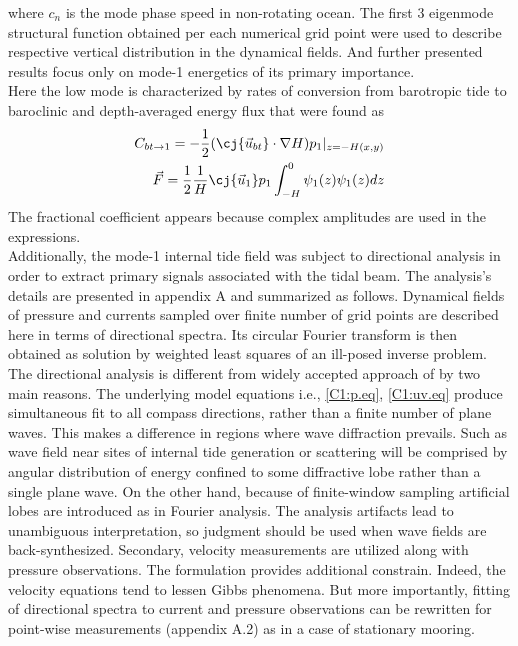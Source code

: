 \documentclass[12pt]{article}
\begin{document}
where $c_n$ is the mode phase speed in non-rotating ocean. The first 3 eigenmode structural 
function obtained per each numerical grid point were used to describe respective vertical 
distribution in the dynamical fields. And further presented results focus only on mode-1 energetics 
of its primary importance.\\
Here the low mode is characterized by rates of conversion from barotropic tide to baroclinic 
\citep{simmons2004internal, kurapov2003m} and depth-averaged energy flux that were found as
\begin{align}
\label{C3:eq.conv}
C_{bt\to 1} = -\frac{1}{2}(\cj{\vec{u}_{bt}} \cdot \nabla H) p_{1}|_{z = -H(x,y)}\\
\vec{F} = \frac{1}{2} \frac{1}{H} \cj{\vec{u}_1} p_1 \int_{-H}^{0} \psi_1(z) \psi_1(z) dz
\end{align}
The fractional coefficient appears because complex amplitudes are used in the expressions.\\
Additionally, the mode-1 internal tide field was subject to directional analysis in order to 
extract primary signals associated with the tidal beam. The analysis's details are presented in 
appendix A and summarized as follows. Dynamical fields of pressure and currents sampled over 
finite number of grid points are described here in terms of directional spectra. Its circular 
Fourier transform is then obtained as solution by weighted least squares of an ill-posed inverse 
problem. The directional analysis is 
different from widely accepted approach of \cite{zhao2010long} by two main reasons. The underlying 
model equations i.e., \eqref{C1:p.eq}, \eqref{C1:uv.eq} produce simultaneous fit to all compass 
directions, rather than a finite number of plane waves. This makes a difference in regions 
where wave diffraction prevails. Such as wave field near sites of internal tide generation or 
scattering will be comprised by angular distribution of energy confined to some diffractive lobe 
rather than a single plane wave. On the other hand, because of finite-window sampling artificial 
lobes are introduced as in Fourier analysis. The analysis artifacts lead to unambiguous 
interpretation, so judgment should be used when wave fields are back-synthesized. Secondary, 
velocity measurements are utilized along with pressure observations. The formulation provides 
additional constrain. Indeed, the velocity equations tend to lessen Gibbs phenomena. But 
more importantly, fitting of directional spectra to current and pressure observations can 
be rewritten for point-wise measurements (appendix A.2) as in a case of stationary mooring.\\
\end{document}
